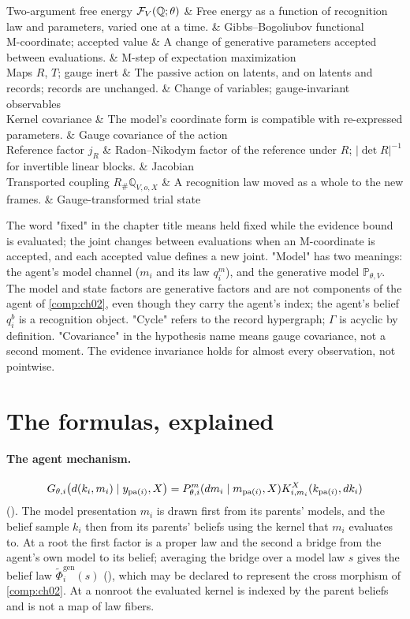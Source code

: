 \begin{decoder}
Two-argument free energy $\mathcal F_V(\mathbb Q;\theta)$ & Free energy as a function of recognition law and parameters, varied one at a time. & Gibbs--Bogoliubov functional \\
M-coordinate; accepted value & A change of generative parameters accepted between evaluations. & M-step of expectation maximization \\
Maps $R$, $T$; gauge inert & The passive action on latents, and on latents and records; records are unchanged. & Change of variables; gauge-invariant observables \\
Kernel covariance & The model's coordinate form is compatible with re-expressed parameters. & Gauge covariance of the action \\
Reference factor $j_R$ & Radon--Nikodym factor of the reference under $R$; $\lvert\det R\rvert^{-1}$ for invertible linear blocks. & Jacobian \\
Transported coupling $R_\#\mathbb Q_{V,o,X}$ & A recognition law moved as a whole to the new frames. & Gauge-transformed trial state \\
\end{decoder}

The word "fixed" in the chapter title means held fixed while the evidence bound is evaluated; the joint changes
between evaluations when an M-coordinate is accepted, and each accepted value defines a new joint. "Model" has two
meanings: the agent's model channel ($m_i$ and its law $q_i^m$), and the generative model $\mathbb P_{\theta,V}$.
The model and state factors are generative factors and are not components of the agent of \cref{comp:ch02}, even
though they carry the agent's index; the agent's belief $q_i^b$ is a recognition object. "Cycle" refers to the
record hypergraph; $\Gamma$ is acyclic by definition. "Covariance" in the hypothesis name means gauge covariance,
not a second moment. The evidence invariance holds for almost every observation, not pointwise.

\section{The formulas, explained}
\label{comp:ch04-formulas}

\paragraph{The agent mechanism.}
\[
G_{\theta,i}\bigl(d(k_i,m_i)\mid y_{\operatorname{pa}(i)},X\bigr)
=P_{\theta,i}^{m}(dm_i\mid m_{\operatorname{pa}(i)},X)K^X_{i,m_i}(k_{\operatorname{pa}(i)},dk_i)
\]
(). The model presentation $m_i$ is drawn first from its parents' models, and the
belief sample $k_i$ then from its parents' beliefs using the kernel that $m_i$ evaluates to. At a root the first
factor is a proper law and the second a bridge from the agent's own model to its belief; averaging the bridge over
a model law $s$ gives the belief law $\widetilde\Phi^{\mathrm{gen}}_i(s)$ (), which may
be declared to represent the cross morphism of \cref{comp:ch02}. At a nonroot the evaluated kernel is indexed by
the parent beliefs and is not a map of law fibers.

